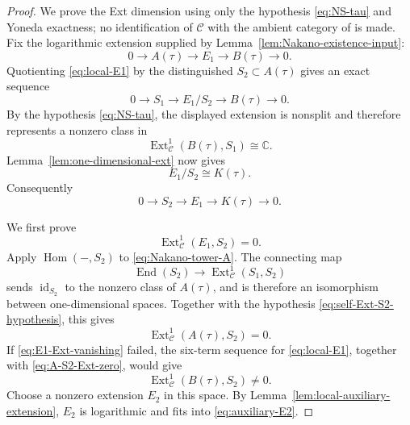 \documentclass[12pt,leqno]{amsart}
\numberwithin{equation}{section}
\newcommand{\End}{\operatorname{End}}
\newcommand{\Hom}{\operatorname{Hom}}
\newcommand{\Ext}{\operatorname{Ext}}
\newcommand{\id}{\operatorname{id}}
\def\C{\mathbb{C}}
\begin{document}
\begin{proof}
We prove the Ext dimension using only the hypothesis
\eqref{eq:NS-tau} and Yoneda exactness; no identification of $\mathscr C$
with the ambient category of \cite[Definition~3.14]{Nakano} is made.
Fix the logarithmic extension supplied by
Lemma~\ref{lem:Nakano-existence-input}:
\begin{equation}\label{eq:local-E1}
 0\longrightarrow A(\tau)\longrightarrow E_1\longrightarrow
 B(\tau)\longrightarrow0.
\end{equation}
Quotienting \eqref{eq:local-E1} by the distinguished
$S_2\subset A(\tau)$ gives an exact sequence
\[
 0\longrightarrow S_1\longrightarrow E_1/S_2
 \longrightarrow B(\tau)\longrightarrow0.
\]
By the hypothesis \eqref{eq:NS-tau}, the displayed extension is
nonsplit and therefore represents a nonzero class in
\[
 \Ext^1_{\mathscr C}(B(\tau),S_1)\cong\C.
\]
Lemma~\ref{lem:one-dimensional-ext} now gives
\[
 E_1/S_2\cong K(\tau).
\]
Consequently
\begin{equation}\label{eq:E1-over-K}
 0\longrightarrow S_2\longrightarrow E_1\longrightarrow
 K(\tau)\longrightarrow0.
\end{equation}

We first prove
\begin{equation}\label{eq:E1-Ext-vanishing}
 \Ext^1_{\mathscr C}(E_1,S_2)=0.
\end{equation}
Apply $\Hom(-,S_2)$ to \eqref{eq:Nakano-tower-A}.  The connecting map
\[
 \End(S_2)\longrightarrow\Ext^1_{\mathscr C}(S_1,S_2)
\]
sends $\id_{S_2}$ to the nonzero class of $A(\tau)$, and is therefore
an isomorphism between one-dimensional spaces.  Together with the hypothesis
\eqref{eq:self-Ext-S2-hypothesis}, this gives
\begin{equation}\label{eq:A-S2-Ext-zero}
 \Ext^1_{\mathscr C}(A(\tau),S_2)=0.
\end{equation}
If \eqref{eq:E1-Ext-vanishing} failed, the six-term sequence for
\eqref{eq:local-E1}, together with \eqref{eq:A-S2-Ext-zero}, would give
\[
 \Ext^1_{\mathscr C}(B(\tau),S_2)\ne0.
\]
Choose a nonzero extension $E_2$ in this space.  By
Lemma~\ref{lem:local-auxiliary-extension}, $E_2$ is logarithmic and
fits into \eqref{eq:auxiliary-E2}.


\end{proof}
\end{document}

